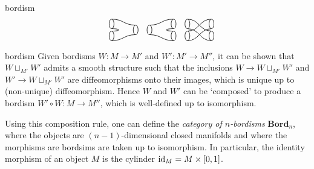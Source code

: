 \begin{example}{bordism}
\[        \quad
        \begin{tikzpicture}[semithick, scale=0.5, baseline=-0.5ex] \begin{scope} \draw (-1,0.5) ellipse (0.2cm and 0.4cm); \draw (-1,-0.5) ellipse (0.2cm and 0.4cm); \draw (1,0) ellipse (0.2cm and 0.4cm); \draw (-1,0.9) .. controls (0,0.9) and (0,0.4) .. (1,0.4); \draw (-1,-0.9) .. controls (0,-0.9) and (0,-0.4) .. (1,-0.4); \draw (-1,0.1) .. controls (-0.2,0.1) and (-0.2,-0.1) .. (-1,-0.1); \end{scope} \end{tikzpicture}
        \quad
        \begin{tikzpicture}[semithick, scale=0.5, baseline=-0.5ex] \begin{scope} \draw (-1,0) ellipse (0.2cm and 0.4cm); \draw (1,0.5) ellipse (0.2cm and 0.4cm); \draw (1,-0.5) ellipse (0.2cm and 0.4cm); \draw (-1,0.4) .. controls (0,0.4) and (0,0.9) .. (1,0.9); \draw (-1,-0.4) .. controls (0,-0.4) and (0,-0.9) .. (1,-0.9); \draw (1,0.1) .. controls (0.2,0.1) and (0.2,-0.1) .. (1,-0.1); \end{scope} \end{tikzpicture}
        \quad
        \begin{tikzpicture}[semithick, scale=0.5, baseline=-0.5ex] \begin{scope} \draw (-1,0.5) ellipse (0.2cm and 0.4cm); \draw (-1,-0.5) ellipse (0.2cm and 0.4cm); \draw (1,0.5) ellipse (0.2cm and 0.4cm); \draw (1,-0.5) ellipse (0.2cm and 0.4cm); \draw (-1,0.9) .. controls (0,0.9) and (0,-0.1) .. (1,-0.1); \draw (-1,0.1) .. controls (0,0.1) and (0,-0.9) .. (1,-0.9); \draw (-1,-0.9) .. controls (0,-0.9) and (0,0.1) .. (1,0.1); \draw (-1,-0.1) .. controls (0,-0.1) and (0,0.9) .. (1,0.9); \end{scope} \end{tikzpicture} \]
\end{example}

\begin{example}{bordism}
    Given bordisms $W : M \to M'$ and $W' : M' \to M''$, it can be shown that $W \sqcup_{M'} W'$ admits a smooth structure such that the inclusions $W \to W \sqcup_{M'} W'$ and $W' \to W \sqcup_{M'} W'$ are diffeomorphisms onto their images, which is unique up to (non-unique) diffeomorphism. Hence $W$ and $W'$ can be `composed' to produce a bordism $W' \circ W : M \to M''$, which is well-defined up to isomorphism.
    
    Using this composition rule, one can define the \textit{category of $n$-bordisms} $\textbf{Bord}_n$, where the objects are $(n - 1)$-dimensional closed manifolds and where the morphisms are bordsims are taken up to isomorphism. In particular, the identity morphism of an object $M$ is the cylinder $\text{id}_M = M \times [0, 1]$.
\end{example}

